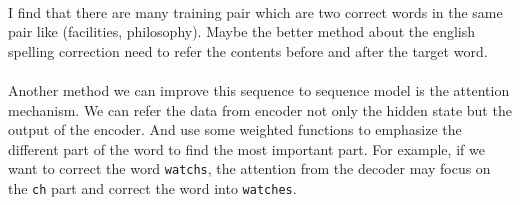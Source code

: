 \paragraph{}
I find that there are many training pair which are two correct words in the same pair like (facilities, philosophy). Maybe the better method about the english spelling correction need to refer the contents before and after the target word.
\paragraph{}
Another method we can improve this sequence to sequence model is the attention mechanism. We can refer the data from encoder not only the hidden state but the output of the encoder. And use some weighted functions to emphasize the different part of the word to find the most important part. For example, if we want to correct the word \texttt{watchs}, the attention from the decoder may focus on the \texttt{ch} part and correct the word into \texttt{watches}. 
